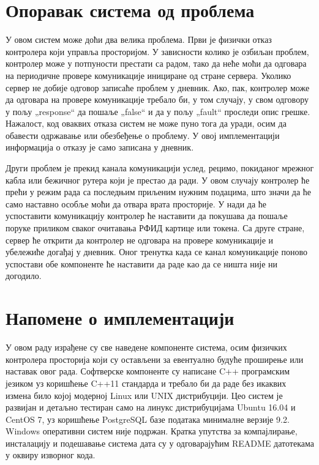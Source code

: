 \documentclass[a4paper, 12pt, diplomski]{etfcyr}
\def\quote#1{„#1“}
\begin{document}
		\section{Опоравак система од проблема}
			\begin{justify}
				У овом систем може доћи два велика проблема. Први је физички отказ контролера који управља просторијом. У зависности колико је озбиљан проблем, контролер може у потпуности престати са радом, тако да неће моћи да одговара на периодичне провере комуникације инициране од стране сервера. Уколико сервер не добије одговор записаће проблем у дневник. Ако, пак, контролер може да одговара на провере комуникације требало би, у том случају, у свом одговору у пољу \quote{response} да пошаље \quote{false} и да у пољу \quote{fault} проследи опис грешке. Нажалост, код оваквих отказа систем не може пуно тога да уради, осим да обавести одржавање или обезбеђење о проблему. У овој имплементацији информација о отказу је само записана у дневник.

				Други проблем је прекид канала комуникацији услед, рецимо, покиданог мрежног кабла или бежичног рутера који је престао да ради. У овом случају контролер ће прећи у режим рада са последњим приљеним нужним подацима, што значи да ће само наставно особље моћи да отвара врата просторије. У нади да ће успоставити комуникацију контролер ће наставити да покушава да пошаље поруке приликом сваког очитавања РФИД картице или токена. Са друге стране, сервер ће открити да контролер не одговара на провере комуникације и убележиће догађај у дневник. Оног тренутка када се канал комуникације поново успостави обе компоненте ће наставити да раде као да се ништа није ни догодило.
			\end{justify}

		\section{Напомене о имплементацији}
			\begin{justify}
				У овом раду израђене су све наведене компоненте система, осим физичких контролера просторија који су остављени за евентуално будуће проширење или наставак овог рада. Софтверске компоненте су написане C++ програмским језиком уз коришћење C++11 стандарда и требало би да раде без икаквих измена било којој модерној Linux или UNIX дистрибуцији. Цео систем је развијан и детаљно тестиран само на линукс дистрибуцијама Ubuntu 16.04 и CentOS 7, уз коришћење PostgreSQL базе података минималне верзије 9.2. Windows оперативни систем није подржан. Кратка упутства за компајлирање, инсталацију и подешавање система дата су у одговарајућим README датотекама у оквиру изворног кода.
			\end{justify}
\end{document}
